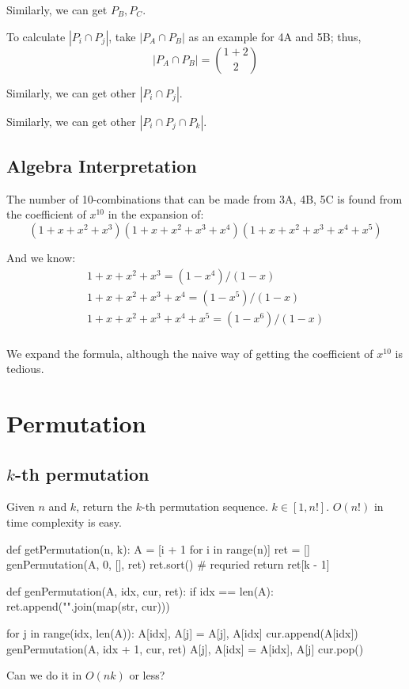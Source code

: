 Similarly, we can get $P_B, P_C$.

To calculate $|P_i \cap P_j|$, take $|P_A \cap P_B|$ as an example for 4A and 5B; thus,
$$
|P_A \cap P_B| = {1+2 \choose 2}
$$

Similarly, we can get other $|P_i \cap P_j|$.

Similarly, we can get other $|P_i \cap P_j \cap P_k|$.
\subsection{Algebra Interpretation}
The number of 10-combinations that can be made from 3A, 4B, 5C is found from the coefficient of $x^{10}$ in the expansion of:
$$
(1+x+x^2+x^3)(1+x+x^2+x^3+x^4)(1+x+x^2+x^3+x^4+x^5)
$$

And we know:
\begin{eqnarray*}
1+x+x^2+x^3         = (1-x^4)/(1-x)  \\
1+x+x^2+x^3+x^4     = (1-x^5)/(1-x)  \\
1+x+x^2+x^3+x^4+x^5 = (1-x^6)/(1-x)  \\
\end{eqnarray*}


We expand the formula, although the  naive way of getting the coefficient of $x^{10}$ is tedious. 

\section{Permutation}

\subsection{$k$-th permutation}
Given $n$ and $k$, return the $k$-th permutation sequence. $k\in [1, n!]$. $O(n!)$ in time complexity is easy.
\begin{python}
def getPermutation(n, k):
    A = [i + 1 for i in range(n)]
    ret = []
    genPermutation(A, 0, [], ret)
    ret.sort()  # requried 
    return ret[k - 1]

def genPermutation(A, idx, cur, ret):
    if idx == len(A):
        ret.append("".join(map(str, cur)))

    for j in range(idx, len(A)):
        A[idx], A[j] = A[j], A[idx]
        cur.append(A[idx])
        genPermutation(A, idx + 1, cur, ret)
        A[j], A[idx] = A[idx], A[j]
        cur.pop()
\end{python}

Can we do it in $O(nk)$ or less?


